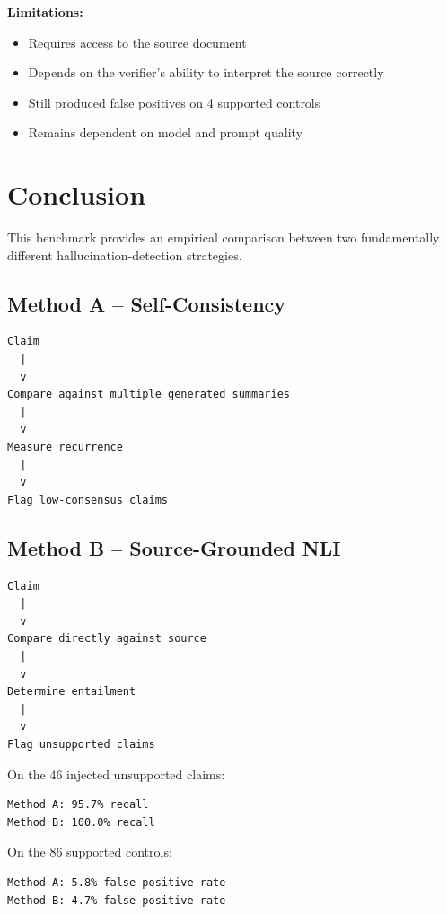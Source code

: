 \documentclass[11pt,a4paper]{article}
\begin{document}
\textbf{Limitations:}

\begin{itemize}
    \item Requires access to the source document
    \item Depends on the verifier's ability to interpret the source correctly
    \item Still produced false positives on 4 supported controls
    \item Remains dependent on model and prompt quality
\end{itemize}


\section{Conclusion}

This benchmark provides an empirical comparison between two fundamentally different hallucination-detection strategies.

\subsection*{Method A -- Self-Consistency}

\begin{lstlisting}
Claim
  |
  v
Compare against multiple generated summaries
  |
  v
Measure recurrence
  |
  v
Flag low-consensus claims
\end{lstlisting}

\subsection*{Method B -- Source-Grounded NLI}

\begin{lstlisting}
Claim
  |
  v
Compare directly against source
  |
  v
Determine entailment
  |
  v
Flag unsupported claims
\end{lstlisting}

On the 46 injected unsupported claims:

\begin{lstlisting}
Method A: 95.7% recall
Method B: 100.0% recall
\end{lstlisting}

On the 86 supported controls:

\begin{lstlisting}
Method A: 5.8% false positive rate
Method B: 4.7% false positive rate
\end{lstlisting}
\end{document}
